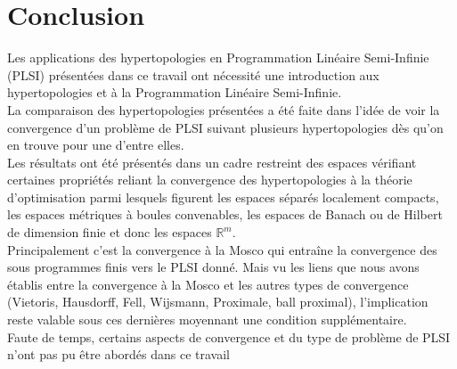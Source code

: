 \documentclass[11pt]{report}
\theoremstyle{styletheorem}
\theoremstyle{styledef}
\theoremstyle{remark}
\newcommand{\R}{\ensuremath{\mathbb{R}}}
\begin{document}
	
	\chapter*{Conclusion}
	Les applications des hypertopologies en Programmation Linéaire Semi-Infinie (PLSI) présentées dans ce travail ont nécessité une introduction aux hypertopologies et à la Programmation Linéaire Semi-Infinie.\\
	La comparaison des hypertopologies présentées a été faite dans l'idée de voir la convergence d'un problème de PLSI suivant plusieurs hypertopologies dès qu'on en trouve pour une d'entre elles. \\
	
	Les résultats ont été présentés  dans un cadre restreint des espaces vérifiant certaines propriétés reliant la convergence des hypertopologies à la théorie d'optimisation parmi lesquels figurent les espaces séparés localement compacts, les espaces métriques à boules convenables, les espaces de Banach ou de Hilbert de dimension finie et donc les espaces $\R^m$.\\
	
	Principalement c'est la convergence à la Mosco qui entraîne la convergence   des sous programmes finis vers le PLSI donné. Mais vu les liens que nous avons établis entre la convergence à la Mosco et les autres types de convergence (Vietoris, Hausdorff, Fell, Wijsmann, Proximale, ball proximal), l'implication reste valable sous ces dernières moyennant une condition supplémentaire.\\
	
	Faute de temps, certains aspects de convergence et du type de problème de PLSI  n'ont pas pu être abordés dans ce travail
	
\end{document}
